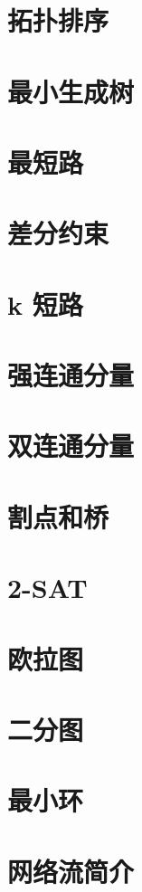 \section{拓扑排序}

\section{最小生成树}

\section{最短路}

\section{差分约束}

\section{k 短路}

  \section{强连通分量}
  
  \section{双连通分量}
  
  \section{割点和桥}
  
  \section{2-SAT}
  
\section{欧拉图}

\section{二分图}

\section{最小环}

  \section{网络流简介}
  
